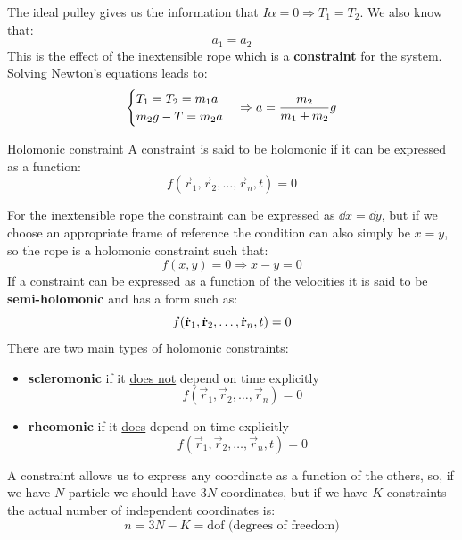 The ideal pulley gives us the information that $I\alpha = 0 \Rightarrow T_1 = T_2$. We also know that:
\[a_1 = a_2\]
This is the effect of the inextensible rope which is a \textbf{constraint} for the system. Solving Newton's equations leads to:
\begin{equation}
    \centering
\begin{cases}
T_1=T_2=m_1a \\
m_2g -T =m_2a \\
\end{cases} \Rightarrow a = \dfrac{m_2}{m_1+m_2}g
\end{equation}
\begin{definition}{Holomonic constraint}
  A constraint is said to be holomonic if it can be expressed as a function:
  \begin{equation}
    f(\vec{r}_1,\vec{r}_2,\dots,\vec{r}_n,t) = 0
  \end{equation}
\end{definition}
For the inextensible rope the constraint can be expressed as $\dd{x}=\dd{y}$, but if we choose an appropriate frame of reference the condition can also simply be $x=y$, so the rope is a holomonic constraint such that:
\begin{equation}
    f(x,y)=0 \Rightarrow x-y=0
\end{equation}
If a constraint can be expressed as a function of the velocities it is said to be \textbf{semi-holomonic} and has a form such as:
\begin{equation}
    f(\dot{\vb{r}}_1,\dot{\vb{r}}_2,\dots,\dot{\vb{r}}_n,t) = 0
\end{equation}
There are two main types of holomonic constraints:
\begin{itemize}
    \item \textbf{scleromonic} if it \underline{does not} depend on time explicitly \[f(\vec{r}_1,\vec{r}_2,\dots,\vec{r}_n) = 0\]
    \item \textbf{rheomonic} if it \underline{does} depend on time explicitly \[f(\vec{r}_1,\vec{r}_2,\dots,\vec{r}_n,t) = 0\]
\end{itemize}
A constraint allows us to express any coordinate as a function of the others, so, if we have $N$ particle we should have $3N$ coordinates, but if we have $K$ constraints the actual number of independent coordinates is:
\begin{equation}
    n = 3N-K = \text{dof (degrees of freedom)}
\end{equation}
